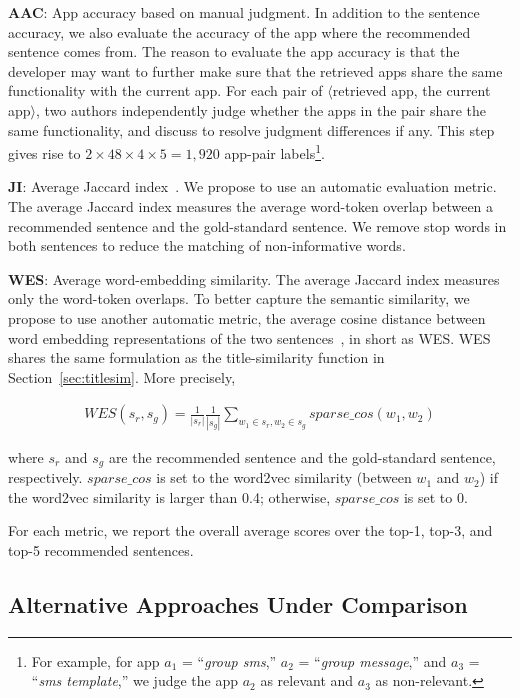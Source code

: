 \textbf{AAC}: App accuracy based on manual judgment. In addition to the sentence accuracy, we also evaluate the accuracy of the app where the recommended sentence comes from. The reason to evaluate the app accuracy is that the developer may want to further make sure that the retrieved apps share the same functionality with the current app. For each pair of $\langle$retrieved app, the current app$\rangle$, two authors independently judge whether the apps in the pair share the same functionality, and discuss to resolve judgment differences if any. This step gives rise to $2\times 48\times 4\times 5 = 1,920$ app-pair labels\footnote{For example, for app $a_1$ = ``\emph{group sms},'' $a_2$ = ``\emph{group message},'' and  $a_3$ = ``\emph{sms template},'' we judge the app $a_2$ as relevant and $a_3$ as non-relevant.}.

\textbf{JI}: Average Jaccard index~\cite{jaccard}. We propose to use an automatic evaluation metric. The average Jaccard index measures the average word-token overlap between a recommended sentence and the gold-standard sentence. We remove stop words in both sentences to reduce the matching of non-informative words. 

\textbf{WES}: Average word-embedding similarity. The average Jaccard index measures only the word-token overlaps. To better capture the semantic similarity, we propose to use another automatic metric, the average cosine distance between word embedding representations of the two sentences~\cite{word2vec}, in short as WES. WES shares the same formulation as the title-similarity function in Section~\ref{sec:titlesim}. More precisely, 

\begin{eqnarray*}
WES(s_r, s_g) = \frac{1}{|s_r|}\frac{1}{|s_g|}\sum_{w_1\in s_r, w_2\in s_g} sparse\_cos(w_1, w_2)
\end{eqnarray*}

\noindent where $s_r$ and $s_g$ are the recommended sentence and the gold-standard sentence, respectively. 
$sparse\_cos$ is set to the word2vec similarity (between $w_1$ and $w_2$) if the word2vec similarity is larger than 0.4; otherwise, $sparse\_cos$ is set to 0. 

For each metric, we report the overall average scores over the top-1, top-3, and top-5 recommended sentences. 

\subsection{Alternative Approaches Under Comparison}
\label{sec:baseline}

